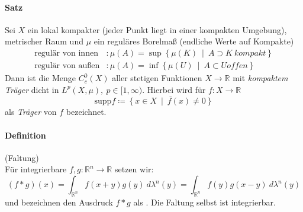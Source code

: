 \documentclass[12pt,a4paper,fleqn]{article}
\def\set#1{{\left\{ #1 \right\}}}
\def\Mid{\ \middle|\ }
\begin{document}
\paragraph{Satz} Sei $X$ ein lokal kompakter (jeder Punkt liegt in einer kompakten Umgebung), metrischer Raum und $\mu$ ein reguläres Borelmaß (endliche Werte auf Kompakte)
\begin{align*}
\text{regulär von innen}&\colon \mu(A) = \sup \set{\mu(K) \Mid A \supset K\ kompakt}\\
\text{regulär von außen}&\colon \mu(A) = \inf \set{\mu(U) \Mid A \subset U \mathit{offen}}
\end{align*}
Dann ist die Menge $C^0_c(X)$ aller stetigen Funktionen $X \rightarrow \mathbb{R}$ mit \textit{kompaktem Träger} dicht in $L^p(X, \mu),\ p \in [1, \infty)$. Hierbei wird für $f\colon X \rightarrow\mathbb{R}$
\begin{displaymath}
\text{supp} f \coloneqq \overline{\set{x \in X \Mid f(x) \not = 0}}
\end{displaymath}
als \textit{Träger} von $f$ bezeichnet.

\paragraph{Definition} (Faltung)\\
Für integrierbare $f, g\colon \mathbb{R}^n \rightarrow \mathbb{R}$ setzen wir:
\begin{displaymath}
(f * g)(x) = \int_{\mathbb{R}^n} f(x + y)g(y)\ d\lambda^n(y) = \int_{\mathbb{R}^n} f(y)g(x  - y)\ d\lambda^n(y)
\end{displaymath}
und bezeichnen den Ausdruck $f * g$ als . Die Faltung selbst ist integrierbar.
\end{document}
